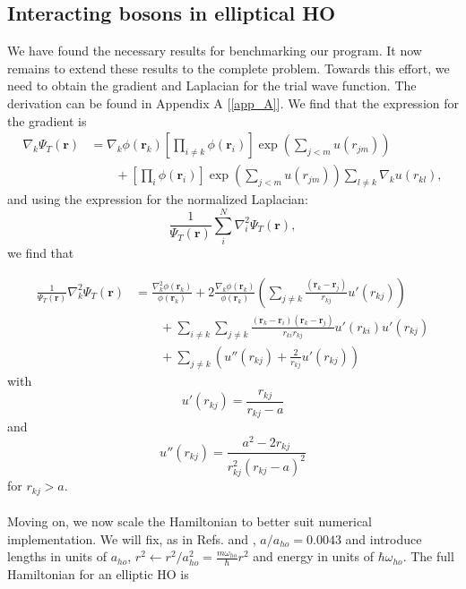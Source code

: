 \documentclass[11pt,a4paper,titlepage]{article}
\begin{document}
\subsection{Interacting bosons in elliptical HO}
We have found the necessary results for benchmarking our program. It now remains to extend these results to the complete problem. Towards this effort, we need to obtain the gradient and Laplacian for the trial wave function. The derivation can be found in Appendix A [\ref{app_A}]. We find that the expression for the gradient is 
\begin{align}
  \nabla_k\Psi_T(\mathbf{r}) &= \nabla_k\phi(\mathbf{r}_k)\left[\prod_{i\ne k}\phi(\mathbf{r}_i)\right]\exp{\left(\sum_{j<m}u(r_{jm})\right)}\label{eq:gradient_interacting}
  \\
  &\qquad
  +  \left[\prod_i\phi(\mathbf{r}_i)\right]
  \exp{\left(\sum_{j<m}u(r_{jm})\right)}\sum_{l\ne k}\nabla_k u(r_{kl}),
\end{align}
and using the expression for the normalized Laplacian:
\begin{equation*}
   \frac{1}{\Psi_T(\mathbf{r})}\sum_i^{N}\nabla_i^2\Psi_T(\mathbf{r}),
\end{equation*}
we find that

\begin{align*}
   \frac{1}{\Psi_T(\mathbf{r})}\nabla_k^2\Psi_T(\mathbf{r})
   &= \frac{\nabla_k^2\phi(\mathbf{r}_k)}{\phi(\mathbf{r}_k)}
   + 2\frac{\nabla_k\phi(\mathbf{r}_k)}{\phi(\mathbf{r}_k)}
   \left(\sum_{j\ne k}\frac{(\mathbf{r}_k-\mathbf{r}_j)}{r_{kj}}u'(r_{kj})\right)
   \\
   &\qquad
   + \sum_{i\ne k}\sum_{j \ne k}\frac{(\mathbf{r}_k-\mathbf{r}_i)(\mathbf{r}_k-\mathbf{r}_j)}{r_{ki}r_{kj}}u'(r_{ki})u'(r_{kj})
   \\
   &\qquad
   + \sum_{j\ne k}\left( u''(r_{kj})+\frac{2}{r_{kj}}u'(r_{kj})\right)
\end{align*}
with 
\begin{equation}
u'(r_{kj}) = \frac{r_{kj}}{r_{kj}-a}
\end{equation}
and
\begin{equation}
u''(r_{kj}) = \frac{a^2-2r_{kj}}{r_{kj}^2(r_{kj}-a)^2}
\end{equation}
for $r_{kj} > a$.\\\\Moving on, we now scale the Hamiltonian to better suit numerical implementation. We will fix, as in Refs. \cite{DuBois_2001} and \cite{Nilsen_2005}, $a/a_{ho}=0.0043$ and introduce lengths in units of $a_{ho}$,
   $r^2\leftarrow r^2/a_{ho}^2 = \frac{m\omega_{ho}}{\hbar}r^2$ and energy in units of $\hbar\omega_{ho}$.
The full Hamiltonian for an elliptic HO is
\end{document}
